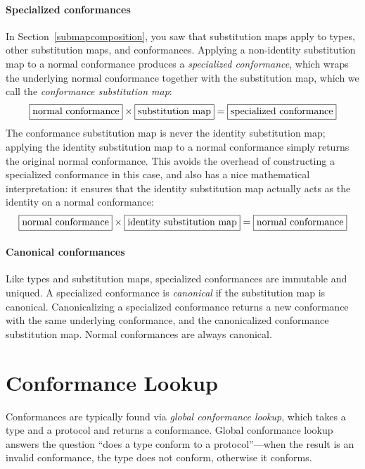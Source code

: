 \documentclass[a4paper,headsepline,bibliography=totoc,toc=flat,fleqn,twoside=semi]{scrbook}
\theoremstyle{definition}
\theoremstyle{definition}
\theoremstyle{definition}
\newcommand{\mathboxed}[1]{\boxed{\mbox{\vphantom{pI\texttt{pI}}#1}}}
\begin{document}
\paragraph{Specialized conformances}
In Section~\ref{submapcomposition}, you saw that substitution maps apply to types, other substitution maps, and conformances. Applying a non-identity substitution map to a normal conformance produces a \emph{specialized conformance}, which wraps the underlying normal conformance together with the substitution map, which we call the \emph{conformance substitution map}:
\[
\mathboxed{normal conformance} \times \mathboxed{substitution map} = \mathboxed{specialized conformance}
\]
The conformance substitution map is never the identity substitution map; applying the identity substitution map to a normal conformance simply returns the original normal conformance. This avoids the overhead of constructing a specialized conformance in this case, and also has a nice mathematical interpretation: it ensures that the identity substitution map actually acts as the identity on a normal conformance:
\[
\mathboxed{normal conformance} \times \mathboxed{identity substitution map} = \mathboxed{normal conformance}
\]
\paragraph{Canonical conformances}
Like types and substitution maps, specialized conformances are immutable and uniqued. A specialized conformance is \emph{canonical} if the substitution map is canonical. Canonicalizing a specialized conformance returns a new conformance with the same underlying conformance, and the canonicalized conformance substitution map. Normal conformances are always canonical.

\section{Conformance Lookup}\label{conformance lookup}

Conformances are typically found via \emph{global conformance lookup}, which takes a type and a protocol and returns a conformance. Global conformance lookup answers the question ``does a type conform to a protocol''---when the result is an invalid conformance, the type does not conform, otherwise it conforms.
\end{document}
